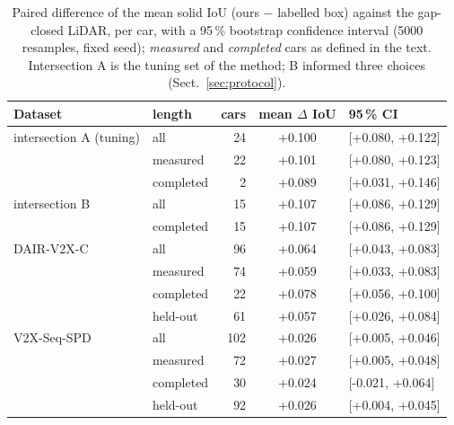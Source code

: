 \begin{table}[t]
\centering
\caption{Paired difference of the mean solid IoU (ours $-$ labelled box) against the gap-closed LiDAR, per car, with a 95\,\% bootstrap confidence interval (5000 resamples, fixed seed); \emph{measured} and \emph{completed} cars as defined in the text. Intersection A is the tuning set of the method; B informed three choices (Sect.~\ref{sec:protocol}).}
\label{tab:paired}
\small
\begin{tabular}{llrcl}
\toprule
Dataset & length & cars & mean $\Delta$ IoU & 95\,\% CI \\
\midrule
intersection A (tuning) & all & 24 & +0.100 & [+0.080, +0.122] \\
 & measured & 22 & +0.101 & [+0.080, +0.123] \\
 & completed & 2 & +0.089 & [+0.031, +0.146] \\
\midrule
intersection B & all & 15 & +0.107 & [+0.086, +0.129] \\
 & completed & 15 & +0.107 & [+0.086, +0.129] \\
\midrule
DAIR-V2X-C & all & 96 & +0.064 & [+0.043, +0.083] \\
 & measured & 74 & +0.059 & [+0.033, +0.083] \\
 & completed & 22 & +0.078 & [+0.056, +0.100] \\
 & held-out & 61 & +0.057 & [+0.026, +0.084] \\
\midrule
V2X-Seq-SPD & all & 102 & +0.026 & [+0.005, +0.046] \\
 & measured & 72 & +0.027 & [+0.005, +0.048] \\
 & completed & 30 & +0.024 & [-0.021, +0.064] \\
 & held-out & 92 & +0.026 & [+0.004, +0.045] \\
\bottomrule
\end{tabular}
\end{table}
